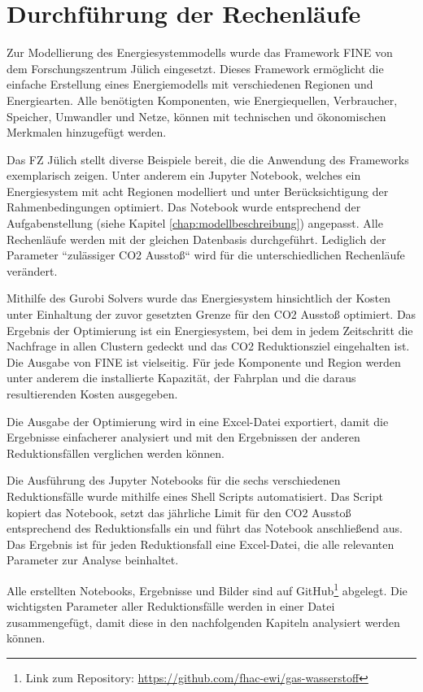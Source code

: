 \section{Durchführung der Rechenläufe}
Zur Modellierung des Energiesystemmodells wurde das Framework FINE von dem Forschungszentrum Jülich eingesetzt.
Dieses Framework ermöglicht die einfache Erstellung eines Energiemodells mit verschiedenen Regionen und Energiearten. Alle benötigten Komponenten, wie Energiequellen, Verbraucher, Speicher, Umwandler und Netze, können mit technischen und ökonomischen Merkmalen hinzugefügt werden. 

Das FZ Jülich stellt diverse Beispiele bereit, die die Anwendung des Frameworks exemplarisch zeigen. Unter anderem ein Jupyter Notebook, welches ein Energiesystem mit acht Regionen modelliert und unter Berücksichtigung der Rahmenbedingungen optimiert.  Das Notebook wurde entsprechend der Aufgabenstellung (siehe Kapitel \ref{chap:modellbeschreibung}) angepasst. Alle Rechenläufe werden mit der gleichen Datenbasis durchgeführt. Lediglich der Parameter ``zulässiger CO2 Ausstoß`` wird für die unterschiedlichen Rechenläufe verändert. 

Mithilfe des Gurobi Solvers wurde das Energiesystem hinsichtlich der Kosten unter Einhaltung der zuvor gesetzten Grenze für den CO2 Ausstoß optimiert. Das Ergebnis der Optimierung ist ein Energiesystem, bei dem in jedem Zeitschritt die Nachfrage in allen Clustern gedeckt und das CO2 Reduktionsziel eingehalten ist. Die Ausgabe von FINE ist vielseitig. Für jede Komponente und Region werden unter anderem die installierte Kapazität, der Fahrplan und die daraus resultierenden Kosten ausgegeben.

Die Ausgabe der Optimierung wird in eine Excel-Datei exportiert, damit die Ergebnisse einfacherer analysiert und mit den Ergebnissen der anderen Reduktionsfällen verglichen werden können. 

Die Ausführung des Jupyter Notebooks für die sechs verschiedenen Reduktionsfälle wurde mithilfe eines Shell Scripts automatisiert. Das Script kopiert das Notebook, setzt das jährliche Limit für den CO2 Ausstoß entsprechend des Reduktionsfalls ein und führt das Notebook anschließend aus. Das Ergebnis ist für jeden Reduktionsfall eine Excel-Datei, die alle relevanten Parameter zur Analyse beinhaltet.

Alle erstellten Notebooks, Ergebnisse und Bilder sind auf GitHub\footnote{Link zum Repository: \url{https://github.com/fhac-ewi/gas-wasserstoff}} abgelegt.  
Die wichtigsten Parameter aller Reduktionsfälle werden in einer Datei zusammengefügt, damit diese in den nachfolgenden Kapiteln analysiert werden können. 
